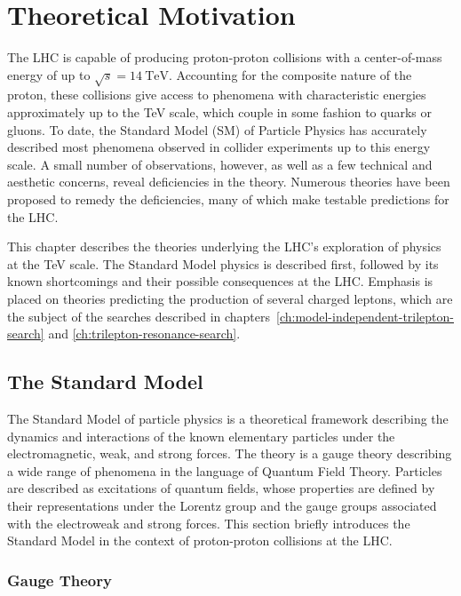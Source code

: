 \chapter{Theoretical Motivation}\label{ch:theory}

The LHC is capable of producing proton-proton collisions with a center-of-mass energy of up to $\sqrt{s}=14~\mbox{TeV}$. Accounting for the composite nature of the proton, these collisions give access to phenomena with characteristic energies approximately up to the TeV scale, which couple in some fashion to quarks or gluons. To date, the Standard Model (SM) of Particle Physics has accurately described most phenomena observed in collider experiments up to this energy scale. A small number of observations, however, as well as a few technical and aesthetic concerns, reveal deficiencies in the theory. Numerous theories have been proposed to remedy the deficiencies, many of which make testable predictions for the LHC.

This chapter describes the theories underlying the LHC's exploration of physics at the TeV scale. The Standard Model physics is described first, followed by its known shortcomings and their possible consequences at the LHC. Emphasis is placed on theories predicting the production of several charged leptons, which are the subject of the searches described in chapters~\ref{ch:model-independent-trilepton-search} and \ref{ch:trilepton-resonance-search}.


\section{The Standard Model}\label{sec:standard-model}
The Standard Model of particle physics is a theoretical framework describing the dynamics and interactions of the known elementary particles under the electromagnetic, weak, and strong forces. The theory is a gauge theory describing a wide range of phenomena in the language of Quantum Field Theory. Particles are described as excitations of quantum fields, whose properties are defined by their representations under the Lorentz group and the gauge groups associated with the electroweak and strong forces. This section briefly introduces the Standard Model in the context of proton-proton collisions at the LHC.


\subsection{Gauge Theory}

